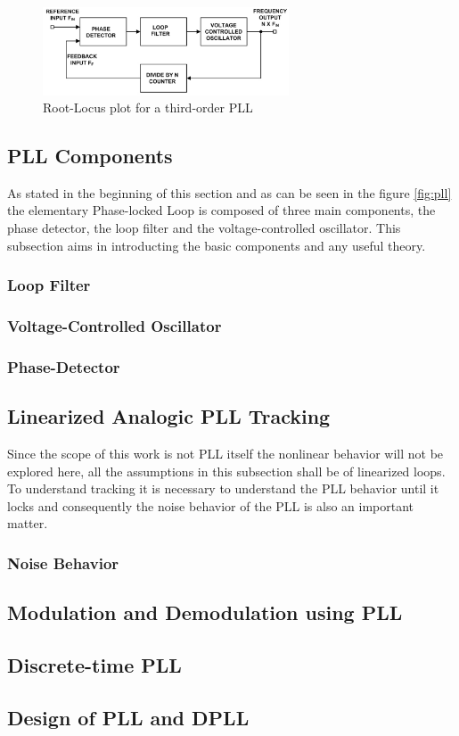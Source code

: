 \begin{figure}[htbp]
    \centering
    \includegraphics[width=0.65\textwidth]{./figures/pll.eps}
    \caption{ Root-Locus plot for a third-order PLL
    \label{fig:rlocus3}}
\end{figure}

\subsection{PLL Components}
As stated in the beginning of this section and as can be seen in the figure
\ref{fig:pll} the elementary Phase-locked Loop is composed of three main 
components, the phase detector, the loop filter and the voltage-controlled 
oscillator. This subsection aims in introducting the basic components and any
useful theory.

\subsubsection{Loop Filter}

\subsubsection{Voltage-Controlled Oscillator}

\subsubsection{Phase-Detector}

\subsection{Linearized Analogic PLL Tracking}
Since the scope of this work is not PLL itself the nonlinear behavior will not
be explored here, all the assumptions in this subsection shall be of linearized
loops.\\
To understand tracking it is necessary to understand the PLL behavior until it
locks and consequently the noise behavior of the PLL is also an important
matter.\\
\subsubsection{Noise Behavior}


\subsection{Modulation and Demodulation using PLL}

\subsection{Discrete-time PLL}

\subsection{Design of PLL and DPLL}